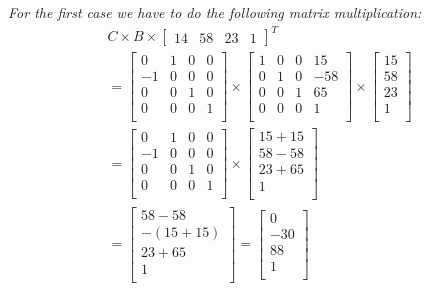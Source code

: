 \documentclass[a4paper,10pt]{article}
\begin{document}
\bigskip
\textit{For the first case we have to do the following matrix multiplication:} 
\begin{align*}
C \times B \times \left[\begin{array}{cccc} 14 &58 &23 &1\end{array}\right]^{T} \\
%
=
\left[\begin{array}{cccc}
  0 	& 1 	& 0 	& 0\\ 
  -1 	& 0	& 0 	& 0\\
  0 	& 0 	& 1 	& 0\\
  0 	& 0 	& 0 	& 1\\
\end{array}\right]
\times
\left[\begin{array}{cccc}
  1 	& 0 	& 0 	& 15\\ 
  0 	& 1	& 0 	& -58\\
  0 	& 0 	& 1 	& 65\\
  0 	& 0 	& 0 	& 1\\
\end{array}\right]
\times
\left[\begin{array}{c}
15\\ 58\\ 23\\ 1\\
\end{array}\right] \\
%
=
\left[\begin{array}{cccc}
  0 	& 1 	& 0 	& 0\\ 
  -1 	& 0	& 0 	& 0\\
  0 	& 0 	& 1 	& 0\\
  0 	& 0 	& 0 	& 1\\
\end{array}\right]
\times
\left[\begin{array}{c}
15+15\\ 58-58\\ 23+65\\ 1\\
\end{array}\right] \\
%
= 
\left[\begin{array}{c}
58-58\\ -(15+15)\\ 23+65\\ 1\\
\end{array}\right] 
=
\left[\begin{array}{c}
0\\ -30\\ 88\\ 1\\
\end{array}\right]
\end{align*}
\end{document}
